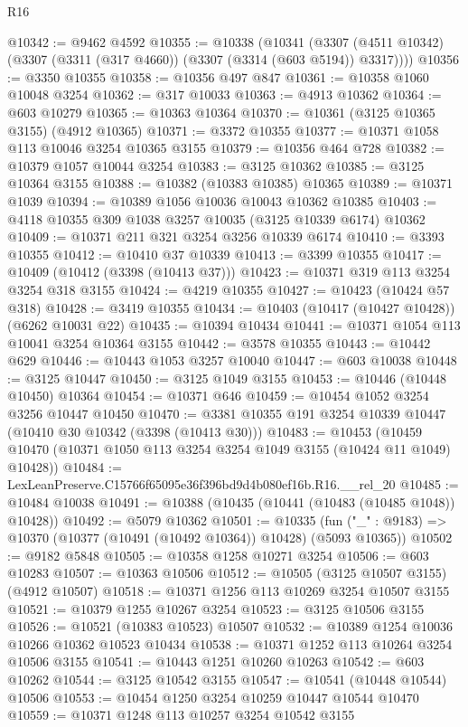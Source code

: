 \begin{lexlean}{R16}
\begin{coremodule}
@10342 := @9462 @4592
@10355 := @10338
    (@10341 (@3307 (@4511 @10342) (@3307 (@3311 (@317 @4660)) (@3307 (@3314 (@603 @5194)) @3317))))
@10356 := @3350 @10355
@10358 := @10356 @497 @847
@10361 := @10358 @1060 @10048 @3254
@10362 := @317 @10033
@10363 := @4913 @10362
@10364 := @603 @10279
@10365 := @10363 @10364
@10370 := @10361 (@3125 @10365 @3155) (@4912 @10365)
@10371 := @3372 @10355
@10377 := @10371 @1058 @113 @10046 @3254 @10365 @3155
@10379 := @10356 @464 @728
@10382 := @10379 @1057 @10044 @3254
@10383 := @3125 @10362
@10385 := @3125 @10364 @3155
@10388 := @10382 (@10383 @10385) @10365
@10389 := @10371 @1039
@10394 := @10389 @1056 @10036 @10043 @10362 @10385
@10403 := @4118 @10355 @309 @1038 @3257 @10035 (@3125 @10339 @6174) @10362
@10409 := @10371 @211 @321 @3254 @3256 @10339 @6174
@10410 := @3393 @10355
@10412 := @10410 @37 @10339
@10413 := @3399 @10355
@10417 := @10409 (@10412 (@3398 (@10413 @37)))
@10423 := @10371 @319 @113 @3254 @3254 @318 @3155
@10424 := @4219 @10355
@10427 := @10423 (@10424 @57 @318)
@10428 := @3419 @10355
@10434 := @10403 (@10417 (@10427 @10428)) (@6262 @10031 @22)
@10435 := @10394 @10434
@10441 := @10371 @1054 @113 @10041 @3254 @10364 @3155
@10442 := @3578 @10355
@10443 := @10442 @629
@10446 := @10443 @1053 @3257 @10040
@10447 := @603 @10038
@10448 := @3125 @10447
@10450 := @3125 @1049 @3155
@10453 := @10446 (@10448 @10450) @10364
@10454 := @10371 @646
@10459 := @10454 @1052 @3254 @3256 @10447 @10450
@10470 := @3381 @10355 @191 @3254 @10339 @10447 (@10410 @30 @10342 (@3398 (@10413 @30)))
@10483 := @10453
    (@10459 @10470 (@10371 @1050 @113 @3254 @3254 @1049 @3155 (@10424 @11 @1049) @10428))
@10484 := LexLeanPreserve.C15766f65095e36f396bd9d4b080ef16b.R16.__rel_20
@10485 := @10484 @10038
@10491 := @10388 (@10435 (@10441 (@10483 (@10485 @1048)) @10428))
@10492 := @5079 @10362
@10501 := @10335
    (fun ("_" : @9183) => @10370 (@10377 (@10491 (@10492 @10364)) @10428) (@5093 @10365))
@10502 := @9182 @5848
@10505 := @10358 @1258 @10271 @3254
@10506 := @603 @10283
@10507 := @10363 @10506
@10512 := @10505 (@3125 @10507 @3155) (@4912 @10507)
@10518 := @10371 @1256 @113 @10269 @3254 @10507 @3155
@10521 := @10379 @1255 @10267 @3254
@10523 := @3125 @10506 @3155
@10526 := @10521 (@10383 @10523) @10507
@10532 := @10389 @1254 @10036 @10266 @10362 @10523 @10434
@10538 := @10371 @1252 @113 @10264 @3254 @10506 @3155
@10541 := @10443 @1251 @10260 @10263
@10542 := @603 @10262
@10544 := @3125 @10542 @3155
@10547 := @10541 (@10448 @10544) @10506
@10553 := @10454 @1250 @3254 @10259 @10447 @10544 @10470
@10559 := @10371 @1248 @113 @10257 @3254 @10542 @3155

\end{coremodule}
\end{lexlean}
